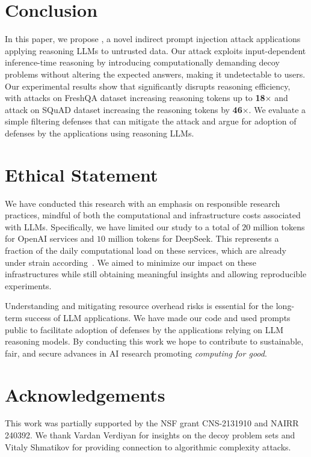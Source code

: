\section{Conclusion}

In this paper, we propose \sys, a novel indirect prompt injection attack applications applying reasoning LLMs to untrusted data. Our attack exploits input-dependent inference-time reasoning by introducing computationally demanding decoy problems without altering the expected answers, making it undetectable to users. Our experimental results show that \sys significantly disrupts reasoning efficiency, with attacks on FreshQA dataset increasing reasoning tokens up to \textbf{18$\times$} and attack on SQuAD dataset increasing the reasoning tokens by \textbf{46}$\times$. We evaluate a simple filtering defenses that can mitigate the attack and argue for adoption of defenses by the applications using reasoning LLMs.


\section*{Ethical Statement}

We have conducted this research with an emphasis on responsible research practices, mindful of both the computational and infrastructure costs associated with LLMs. Specifically, we have limited our study to a total of $20$ million tokens for OpenAI services and $10$ million tokens for DeepSeek. This represents a fraction of the daily computational load on these services, which are already under strain according~\cite{deepseek2025}. We aimed to minimize our impact on these infrastructures while still obtaining meaningful insights and allowing reproducible experiments. 

Understanding and mitigating resource overhead risks is essential for the long-term success of LLM applications. We have made our code and used prompts public to facilitate adoption of defenses by the applications relying on LLM reasoning models. By conducting this work we hope to contribute to sustainable, fair, and secure advances in AI research promoting \textit{computing for good}.

\section*{Acknowledgements}
This work was partially supported by the NSF grant CNS-2131910 and NAIRR 240392. We thank Vardan Verdiyan for insights on the decoy problem sets and Vitaly Shmatikov for providing connection to algorithmic complexity attacks.



